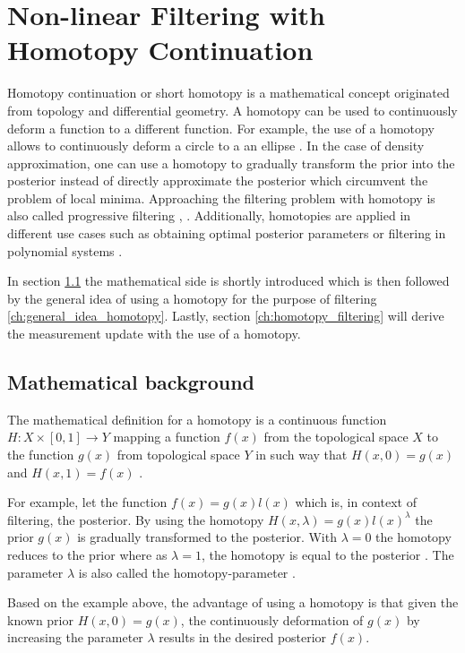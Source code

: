 \documentclass[a4paper]{IEEEtran}
\begin{document}
\section{Non-linear Filtering with Homotopy Continuation}
\label{ch:homotopy_continuation}

Homotopy continuation or short homotopy is a mathematical concept originated from topology and differential geometry. A homotopy can be used to continuously deform a function to a different function. For example, the use of a homotopy allows to continuously deform a
circle to a an ellipse \cite{liao2012}. In the case of density approximation, one can use a homotopy to gradually transform the prior into the posterior instead of directly approximate the posterior which circumvent the problem of local minima. Approaching the filtering problem 
with homotopy is also called progressive filtering \cite{hanebeck2003}, \cite{hanebeck2012a}. Additionally, homotopies are applied in different use cases such as obtaining optimal posterior parameters \cite{hagmar2011} or filtering in polynomial systems \cite{huber}.

In section \ref{ch:math_background_homotopy} the mathematical side is shortly introduced which is then followed by the general idea of using a homotopy for the purpose of filtering \ref{ch:general_idea_homotopy}. 
Lastly, section \ref{ch:homotopy_filtering} will derive the measurement update with the use of a homotopy.

\subsection{Mathematical background}
\label{ch:math_background_homotopy}
The mathematical definition for a homotopy is a continuous function $H:X \times [0,1] \rightarrow Y$ mapping a function $f(x)$ from the topological space $X$ to the function $g(x)$ from topological space $Y$ in such way 
that $H(x,0)=g(x)$ and $H(x,1)=f(x)$ \cite{liao2012}. 

For example, let the function $f(x)=g(x)l(x)$ which is, in context of filtering, the  posterior. By using the homotopy $H(x, \lambda) = g(x)l(x)^{\lambda}$ the prior
$g(x)$ is gradually transformed to the posterior. With $\lambda = 0$ the homotopy reduces to the prior where as $\lambda = 1$, the homotopy is equal to the posterior \cite{daum2007}. The parameter $\lambda$ is also called the homotopy-parameter \cite{liao2012}.

Based on the example above, the advantage of using a homotopy is that given the known prior $H(x,0)=g(x)$, the continuously deformation of $g(x)$ by increasing the parameter $\lambda$ 
results in the desired posterior $f(x)$. 
\end{document}
